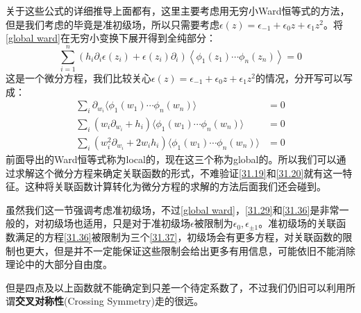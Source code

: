 关于这些公式的详细推导\cite{ito}上面都有，这里主要考虑用无穷小Ward恒等式的方法，但是我们考虑的毕竟是准初级场，所以只需要考虑$\epsilon(z)=\epsilon_{-1}+\epsilon_0z+\epsilon_1z^2$。将\ref{global ward}在无穷小变换下展开得到全纯部分：
\begin{equation}\label{31.36}
	\boxed{
		\displaystyle\sum_{i=1}^{n}\left(h_{i}\partial_{i}\epsilon\left(z_{i}\right)+\epsilon\left(z_{i}\right)\partial_{i}\right)\left<\phi_{1}\left(z_{1}\right)\cdots\phi_{n}\left(z_{n}\right)\right>=0
	}
\end{equation}
这是一个微分方程，我们比较关心$\epsilon(z)=\epsilon_{-1}+\epsilon_0z+\epsilon_1z^2$的情况，分开写可以写成：
\begin{equation}\label{31.37}
	\begin{aligned}\sum_i\partial_{w_i}\langle\phi_1(w_1)\cdots\phi_n(w_n)\rangle&=0\\\sum_i(w_i\partial_{w_i}+h_i)\langle\phi_1(w_1)\cdots\phi_n(w_n)\rangle&=0\\\sum_i(w_i^2\partial_{w_i}+2w_ih_i)\langle\phi_1(w_1)\cdots\phi_n(w_n)\rangle&=0\end{aligned}
\end{equation}
前面导出的Ward恒等式称为local的，现在这三个称为global的。所以我们可以通过求解这个微分方程来确定关联函数的形式，不难验证\ref{31.19}和\ref{31.20}就有这一特征。这种将关联函数计算转化为微分方程的求解的方法后面我们还会碰到。
\begin{remark}
	虽然我们这一节强调考虑准初级场，不过\ref{global ward}，\ref{31.29}和\ref{31.36}是非常一般的，对初级场也适用，只是对于准初级场$\epsilon$被限制为$\epsilon_0,\epsilon_{\pm1}$。准初级场的关联函数满足的方程\ref{31.36}被限制为三个\ref{31.37}，初级场会有更多方程，对关联函数的限制也更大，但是并不一定能保证这些限制会给出更多有用信息，可能依旧不能消除理论中的大部分自由度。
\end{remark}
但是四点及以上函数就不能确定到只差一个待定系数了，不过我们仍旧可以利用所谓\textbf{交叉对称性}(Crossing Symmetry)走的很远。

